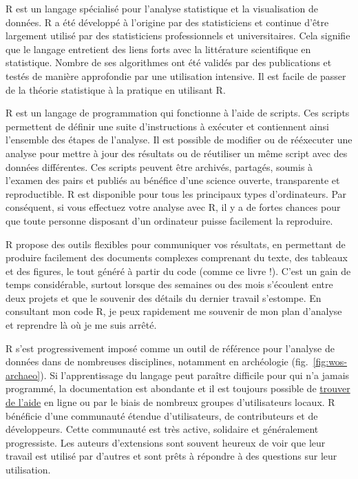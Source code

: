 \documentclass[
  french,
]{scrbook}
\providecommand{\tightlist}{%
  \setlength{\itemsep}{0pt}\setlength{\parskip}{0pt}}
\begin{document}
\begin{description}
\tightlist
\item[R est robuste]
R est un langage spécialisé pour l'analyse statistique et la visualisation de données. R a été développé à l'origine par des statisticiens et continue d'être largement utilisé par des statisticiens professionnels et universitaires. Cela signifie que le langage entretient des liens forts avec la littérature scientifique en statistique. Nombre de ses algorithmes ont été validés par des publications et testés de manière approfondie par une utilisation intensive. Il est facile de passer de la théorie statistique à la pratique en utilisant R.
\item[R facilite la reproductibilité]
R est un langage de programmation qui fonctionne à l'aide de scripts. Ces scripts permettent de définir une suite d'instructions à exécuter et contiennent ainsi l'ensemble des étapes de l'analyse. Il est possible de modifier ou de rééxecuter une analyse pour mettre à jour des résultats ou de réutiliser un même script avec des données différentes. Ces scripts peuvent être archivés, partagés, soumis à l'examen des pairs et publiés au bénéfice d'une science ouverte, transparente et reproductible. R est disponible pour tous les principaux types d'ordinateurs. Par conséquent, si vous effectuez votre analyse avec R, il y a de fortes chances pour que toute personne disposant d'un ordinateur puisse facilement la reproduire.
\item[R facilite la publication]
R propose des outils flexibles pour communiquer vos résultats, en permettant de produire facilement des documents complexes comprenant du texte, des tableaux et des figures, le tout généré à partir du code (comme ce livre !). C'est un gain de temps considérable, surtout lorsque des semaines ou des mois s'écoulent entre deux projets et que le souvenir des détails du dernier travail s'estompe. En consultant mon code R, je peux rapidement me souvenir de mon plan d'analyse et reprendre là où je me suis arrêté.
\item[R est collaboratif]
R s'est progressivement imposé comme un outil de référence pour l'analyse de données dans de nombreuses disciplines, notamment en archéologie (fig.~\ref{fig:wos-archaeo}). Si l'apprentissage du langage peut paraître difficile pour qui n'a jamais programmé, la documentation est abondante et il est toujours possible de \protect\hyperlink{aide}{trouver de l'aide} en ligne ou par le biais de nombreux groupes d'utilisateurs locaux. R bénéficie d'une communauté étendue d'utilisateurs, de contributeurs et de développeurs. Cette communauté est très active, solidaire et généralement progressiste. Les auteurs d'extensions sont souvent heureux de voir que leur travail est utilisé par d'autres et sont prêts à répondre à des questions sur leur utilisation.
\end{description}
\end{document}

